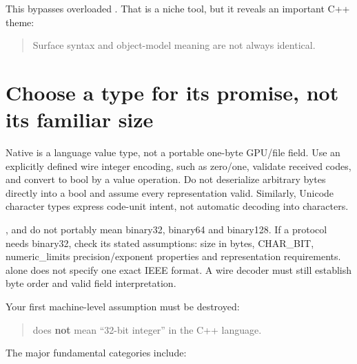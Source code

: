 This bypasses overloaded . That is a niche tool, but it reveals an important C++ theme:

\begin{quote}
Surface syntax and object-model meaning are not always identical.
\end{quote}

\section{Choose a type for its promise, not its familiar size}\label{05-engine-i-ch002-choose-a-type-for-its-promise-not-its-familiar-size}

\hypertarget{05-engine-i-ch002-choose-a-type-for-its-promise-not-its-familiar-size}{}

Native  is a language value type, not a portable one-byte GPU/file field. Use an explicitly defined wire integer encoding, such as zero/one, validate received codes, and convert to bool by a value operation. Do not deserialize arbitrary bytes directly into a bool and assume every representation valid. Similarly, Unicode character types express code-unit intent, not automatic decoding into characters.

,  and  do not portably mean binary32, binary64 and binary128. If a protocol needs binary32, check its stated assumptions: size in bytes, CHAR\_BIT, numeric\_limits precision/exponent properties and representation requirements.  alone does not specify one exact IEEE format. A wire decoder must still establish byte order and valid field interpretation.

Your first machine-level assumption must be destroyed:

\begin{quote}
 does \textbf{not} mean ``32-bit integer'' in the C++ language.
\end{quote}

The major fundamental categories include:

